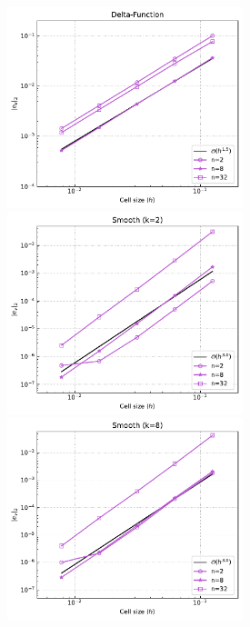 \documentclass[12pt]{article}
\numberwithin{equation}{subsection}
\begin{document}
\begin{figure}
	\vspace{-0.3in}
	
	\begin{multicols}{3}
		\includegraphics[width=6.85cm]{../Annulus_Benchmark_Kramer/benchmark_figs/case3_k_0_vel_err_conv_vel_penalty_2.5e+08_stokes_tol_1.0e-10.pdf}\par
		\hspace{-0.08in}
		\includegraphics[width=6.85cm]{../Annulus_Benchmark_Kramer/benchmark_figs/case4_k_2_vel_err_conv_vel_penalty_2.5e+08_stokes_tol_1.0e-10.pdf}\par
		\hspace{-0.12in}
		\includegraphics[width=6.85cm]{../Annulus_Benchmark_Kramer/benchmark_figs/case4_k_8_vel_err_conv_vel_penalty_2.5e+08_stokes_tol_1.0e-10.pdf}
	\end{multicols}
	

\end{figure}
\end{document}
